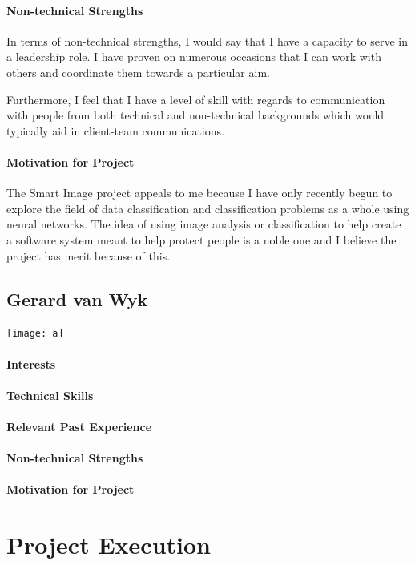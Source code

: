 \documentclass[12pt]{article}
\begin{document}
\paragraph{Non-technical Strengths}
In terms of non-technical strengths, I would say that I have a capacity to serve in a leadership role. I have proven on numerous occasions that I can work with others and coordinate them towards a particular aim.

Furthermore, I feel that I have a level of skill with regards to communication with people from both technical and non-technical backgrounds which would typically aid in client-team communications.
\paragraph{Motivation for Project}
The Smart Image project appeals to me because I have only recently begun to explore the field of data classification and classification problems as a whole using neural networks. The idea of using image analysis or classification to help create a software system meant to help protect people is a noble one and I believe the project has merit because of this.

\subsection{Gerard van Wyk}
\texttt{[image: a]}
\paragraph{Interests}
\paragraph{Technical Skills}
\paragraph{Relevant Past Experience}
\paragraph{Non-technical Strengths}
\paragraph{Motivation for Project}

\section{Project Execution}
\end{document}
